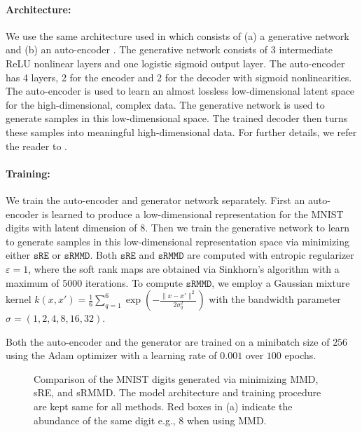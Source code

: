 \documentclass{article}
\theoremstyle{definition}
\newcommand{\sre}{\mathtt{sRE}}
\newcommand{\srmmd}{\mathtt{sRMMD}}
\begin{document}
\paragraph{Architecture:} We use the same architecture used in \cite{li2015generative} which consists of (a) a generative network and (b) an auto-encoder \cite{kingma2013auto}. The generative network consists of 3 intermediate ReLU nonlinear layers and
one logistic sigmoid output layer. The auto-encoder has 4 layers, 2 for the encoder and 2 for the decoder with sigmoid nonlinearities. The auto-encoder is used to learn an almost lossless low-dimensional latent space for the high-dimensional, complex data. The generative network is used to generate samples in this low-dimensional space. The trained decoder then turns these samples into meaningful high-dimensional data.  For further details, we refer the reader to \cite{li2015generative}.

\paragraph{Training:} We train the auto-encoder and generator network separately. First an auto-encoder is learned to produce a low-dimensional representation for the MNIST digits with latent dimension of $8$. Then we train the generative network to learn to generate samples in this low-dimensional representation space via minimizing either $\sre$ or $\srmmd$. Both $\sre$ and $\srmmd$ are computed with entropic regularizer $\varepsilon =1$, where the soft rank maps are obtained via Sinkhorn's algorithm \cite{peyre2019computational} with a maximum of 5000 iterations. To compute $\srmmd$, we employ a Gaussian mixture kernel {\small $k(x, x')= \frac{1}{6}\sum_{q=1}^6\exp(-\frac{\|x-x'\|^2}{2\sigma_q^2})$} with the bandwidth parameter $\sigma= (1, 2, 4, 8, 16, 32)$.

Both the auto-encoder and the generator are trained on a minibatch size of $256$ using the Adam optimizer \cite{kingma2019introduction} with a learning rate of $0.001$ over $100$ epochs. 
\begin{figure}[H] 
  \centering
  \hspace{-8mm}
  \hspace{-8mm}
  \caption{Comparison of the MNIST digits generated via minimizing MMD, sRE, and sRMMD. The model architecture and training procedure are kept same for all methods. Red boxes in (a) indicate the abundance of the same digit e.g., 8 when using MMD.}
  \label{fig:mnist_result_01}
  \vspace{-4mm}
\end{figure}
\end{document}
